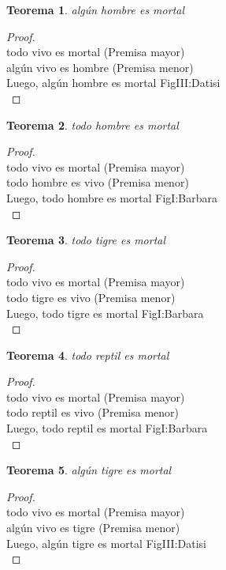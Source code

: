 ﻿\documentclass[12pt]{book}
\newtheorem{theorem}{Teorema}[chapter]
\newtheorem{proof}{Demostración}
\begin{document}
\begin{theorem}
algún hombre es mortal
\label{th: 69}
\end{theorem}\begin{proof}\\todo vivo es mortal	 (Premisa mayor) \\algún vivo es hombre	 (Premisa menor) \\Luego, algún hombre es mortal	FigIII:Datisi \\ \end{proof}
\begin{theorem}
todo hombre es mortal
\label{th: 70}
\end{theorem}\begin{proof}\\todo vivo es mortal	 (Premisa mayor) \\todo hombre es vivo	 (Premisa menor) \\Luego, todo hombre es mortal	FigI:Barbara \\ \end{proof}
\begin{theorem}
todo tigre es mortal
\label{th: 71}
\end{theorem}\begin{proof}\\todo vivo es mortal	 (Premisa mayor) \\todo tigre es vivo	 (Premisa menor) \\Luego, todo tigre es mortal	FigI:Barbara \\ \end{proof}
\begin{theorem}
todo reptil es mortal
\label{th: 72}
\end{theorem}\begin{proof}\\todo vivo es mortal	 (Premisa mayor) \\todo reptil es vivo	 (Premisa menor) \\Luego, todo reptil es mortal	FigI:Barbara \\ \end{proof}
\begin{theorem}
algún tigre es mortal
\label{th: 73}
\end{theorem}\begin{proof}\\todo vivo es mortal	 (Premisa mayor) \\algún vivo es tigre	 (Premisa menor) \\Luego, algún tigre es mortal	FigIII:Datisi \\ \end{proof}
\end{document}
